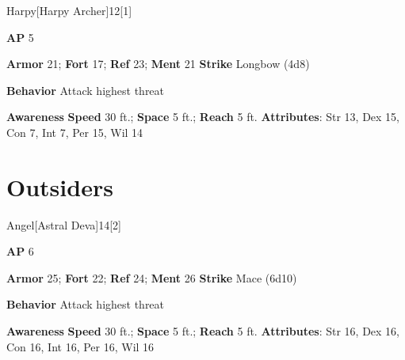 \begin{monsection}{Harpy}[Harpy Archer]{12}[1]
\vspace{-1em}\vspace{-1em}
\begin{spellcontent}
\begin{spelltargetinginfo}
{\textbf{AP} 5}

\pari \textbf{Armor} 21;
\textbf{Fort} 17;
\textbf{Ref} 23;
\textbf{Ment} 21
\pari \textbf{Strike} Longbow  (4d8)



\pari \textbf{Behavior} Attack highest threat
\end{spelltargetinginfo}
\end{spellcontent}

\begin{monsterfooter}
\pari \textbf{Awareness} 
\pari \textbf{Speed} 30 ft.;
\textbf{Space} 5 ft.;
\textbf{Reach} 5 ft.
\pari \textbf{Attributes}:
Str 13,
Dex 15,
Con 7,
Int 7,
Per 15,
Wil 14
\end{monsterfooter}
\end{monsection}

\section{Outsiders}
\begin{monsection}{Angel}[Astral Deva]{14}[2]
\vspace{-1em}\vspace{-1em}
\begin{spellcontent}
\begin{spelltargetinginfo}
{\textbf{AP} 6}

\pari \textbf{Armor} 25;
\textbf{Fort} 22;
\textbf{Ref} 24;
\textbf{Ment} 26
\pari \textbf{Strike} Mace  (6d10)



\pari \textbf{Behavior} Attack highest threat
\end{spelltargetinginfo}
\end{spellcontent}

\begin{monsterfooter}
\pari \textbf{Awareness} 
\pari \textbf{Speed} 30 ft.;
\textbf{Space} 5 ft.;
\textbf{Reach} 5 ft.
\pari \textbf{Attributes}:
Str 16,
Dex 16,
Con 16,
Int 16,
Per 16,
Wil 16
\end{monsterfooter}
\end{monsection}


